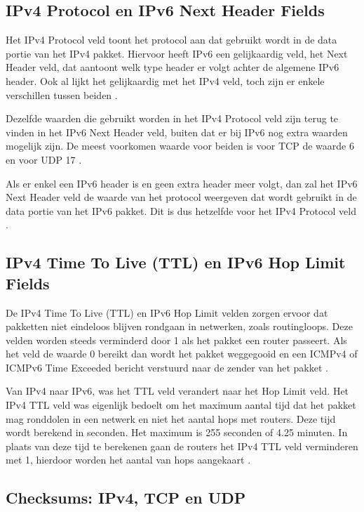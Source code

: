 \subsection{IPv4 Protocol en IPv6 Next Header Fields}

Het IPv4 Protocol veld toont het protocol aan dat gebruikt wordt in de data portie van het IPv4 pakket. Hiervoor heeft IPv6 een gelijkaardig veld, het Next Header veld, dat aantoont welk type header er volgt achter de algemene IPv6 header. Ook al lijkt het gelijkaardig met het IPv4 veld, toch zijn er enkele verschillen tussen beiden \autocite{Graziani2017}.

Dezelfde waarden die gebruikt worden in het IPv4 Protocol veld zijn terug te vinden in het IPv6 Next Header veld, buiten dat er bij IPv6 nog extra waarden mogelijk zijn. De meest voorkomen waarde voor beiden is voor TCP de waarde 6 en voor UDP 17 \autocite{Graziani2017}.

Als er enkel een IPv6 header is en geen extra header meer volgt, dan zal het IPv6 Next Header veld de waarde van het protocol weergeven dat wordt gebruikt in de data portie van het IPv6 pakket. Dit is dus hetzelfde voor het IPv4 Protocol veld \autocite{Graziani2017}.

\subsection{IPv4 Time To Live (TTL) en IPv6 Hop Limit Fields}

De IPv4 Time To Live (TTL) en IPv6 Hop Limit velden zorgen ervoor dat pakketten niet eindeloos blijven rondgaan in netwerken, zoals routingloops. Deze velden worden steeds verminderd door 1 als het pakket een router passeert. Als het veld de waarde 0 bereikt dan wordt het pakket weggegooid en een ICMPv4 of ICMPv6 Time Exceeded bericht verstuurd naar de zender van het pakket \autocite{Graziani2017}. 

Van IPv4 naar IPv6, was het TTL veld verandert naar het Hop Limit veld. Het IPv4 TTL veld was eigenlijk bedoelt om het maximum aantal tijd dat het pakket mag ronddolen in een netwerk en niet het aantal hops met routers. Deze tijd wordt berekend in seconden. Het maximum is 255 seconden of 4.25 minuten. In plaats van deze tijd te berekenen gaan de routers het IPv4 TTL veld verminderen met 1, hierdoor worden het aantal van hops aangekaart \autocite{Graziani2017}.

\subsection{Checksums: IPv4, TCP en UDP}

